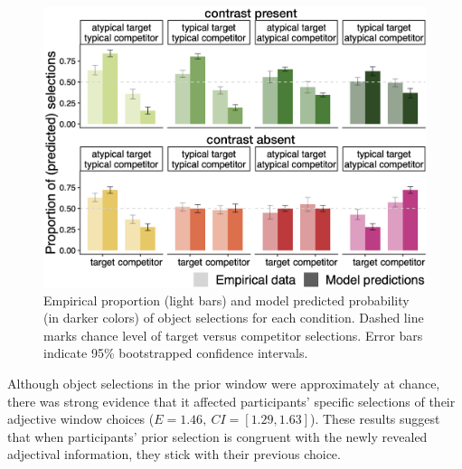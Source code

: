 \documentclass[10pt,letterpaper]{article}
\begin{document}

\begin{figure}
	\begin{center}
		\includegraphics[width=.475\textwidth]{graphs/model-bycond-paper.pdf}
	\end{center}
\caption{Empirical proportion (light bars) and model predicted probability (in darker colors) of object selections for each condition. Dashed line marks chance level of target versus competitor selections. Error bars indicate 95\% bootstrapped confidence intervals.} %
\label{modelcompr-results}
\end{figure}

Although object selections in the prior window were approximately at chance, there was strong evidence that it affected participants' specific selections of their adjective window choices ($E=1.46,\ CI=[1.29,1.63]$). These results suggest that when participants' prior selection is congruent with the newly revealed adjectival information, they stick with their previous choice. 

\end{document}
